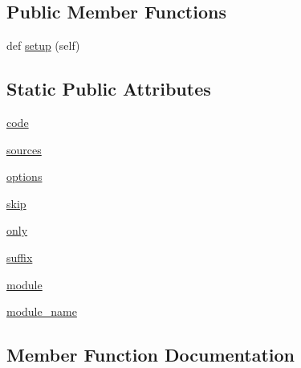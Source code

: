 \subsection*{Public Member Functions}
\begin{DoxyCompactItemize}
\item 
def \hyperlink{classnumpy_1_1f2py_1_1tests_1_1util_1_1F2PyTest_a60b2824a776b3144059819a9b0778f1a}{setup} (self)
\end{DoxyCompactItemize}
\subsection*{Static Public Attributes}
\begin{DoxyCompactItemize}
\item 
\hyperlink{classnumpy_1_1f2py_1_1tests_1_1util_1_1F2PyTest_af1b14778be8525c89939b17670e6b1d3}{code}
\item 
\hyperlink{classnumpy_1_1f2py_1_1tests_1_1util_1_1F2PyTest_adea226d5378aac1c35364718938c30ae}{sources}
\item 
\hyperlink{classnumpy_1_1f2py_1_1tests_1_1util_1_1F2PyTest_a12ab5c7b789040e7eda53e1bcdbb5271}{options}
\item 
\hyperlink{classnumpy_1_1f2py_1_1tests_1_1util_1_1F2PyTest_a1c9f178caf1d9864146ad680d3461c98}{skip}
\item 
\hyperlink{classnumpy_1_1f2py_1_1tests_1_1util_1_1F2PyTest_ab4165fd2b73a488a34bdb5778b25d10d}{only}
\item 
\hyperlink{classnumpy_1_1f2py_1_1tests_1_1util_1_1F2PyTest_a314134a7caff498f434c7a73fc1f5708}{suffix}
\item 
\hyperlink{classnumpy_1_1f2py_1_1tests_1_1util_1_1F2PyTest_a12effe9e45d44261e2d0d85a107f2712}{module}
\item 
\hyperlink{classnumpy_1_1f2py_1_1tests_1_1util_1_1F2PyTest_a3b1c84766d7f978bfaa4ee68c65a2f44}{module\+\_\+name}
\end{DoxyCompactItemize}


\subsection{Member Function Documentation}
\mbox{\label{classnumpy_1_1f2py_1_1tests_1_1util_1_1F2PyTest_a60b2824a776b3144059819a9b0778f1a}} 
